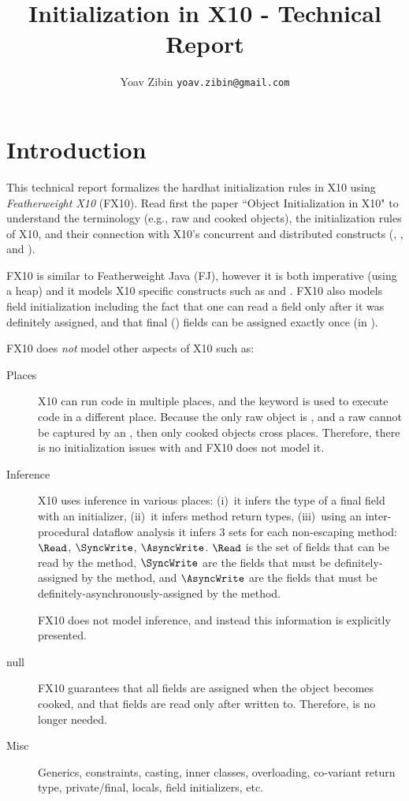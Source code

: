 \documentclass[a4paper]{article}
\title{Initialization in X10 - Technical Report}
\author{Yoav Zibin \texttt{yoav.zibin@gmail.com}}
\date{}
\begin{document}
\maketitle


\lstset{language=java,basicstyle=\ttfamily\small}

\section{Introduction}
This technical report formalizes the hardhat initialization rules in X10
    using \emph{Featherweight X10} (FX10).
Read first the paper ``Object Initialization in X10" to understand
    the terminology (e.g., raw and cooked objects),
    the initialization rules of X10,
    and their connection with X10's concurrent and distributed constructs (\finish, \async, and ).

FX10 is similar to Featherweight Java (FJ), however it is both imperative (using a heap) and it
    models X10 specific constructs such as \finish and \async.
FX10 also models field initialization including the fact that one can read a field only after it was definitely assigned,
    and that final () fields can be assigned exactly once (in ).

FX10 does \emph{not} model other aspects of X10 such as:
\begin{description}
  \item[Places] X10 can run code in multiple places, and the  keyword is used to execute code in a different place.
    Because the only raw object is \this,
        and a raw \this cannot be captured by an ,
        then only cooked objects cross places.
    Therefore, there is no initialization issues with  and FX10 does not model it.
  \item[Inference]
    X10 uses inference in various places:
        (i)~it infers the type of a final field with an initializer,
        (ii)~it infers method return types,
        (iii)~using an inter-procedural dataflow analysis it infers
            3 sets for each non-escaping method: $\Read$, $\SyncWrite$, $\AsyncWrite$.
            $\Read$ is the set of fields that can be read by the method,
                $\SyncWrite$ are the fields that must be definitely-assigned by the method,
                and $\AsyncWrite$ are the fields that must be definitely-asynchronously-assigned by the method.

    FX10 does not model inference, and instead this information is explicitly presented.
  \item[null]
    FX10 guarantees that all fields are assigned when the object becomes cooked,
        and that fields are read only after written to.
    Therefore, \hnull is no longer needed.

  \item[Misc]
    Generics, constraints, casting, inner classes, overloading, co-variant return type, private/final,
    locals, field initializers, etc.
\end{description}
\end{document}
